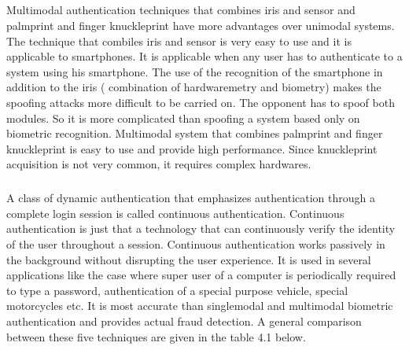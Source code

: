 \documentclass[10pt,a4paper,journal]{IEEEtran}
\begin{document}
\subparagraph{}
Multimodal authentication techniques that combines iris and sensor and palmprint and finger knuckleprint have more advantages over unimodal systems. The technique that combiles iris and sensor is very easy to use and it is applicable to smartphones. It is applicable when any user has to authenticate to a system using his smartphone. The use of the recognition of the smartphone in addition to the iris ( combination of hardwaremetry and biometry) makes the spoofing attacks more difficult to be carried on. The opponent has to spoof both modules. So it is more complicated than spooﬁng a system based only on biometric recognition. Multimodal system that combines palmprint and finger knuckleprint is easy to use and provide high performance. Since knuckleprint acquisition is not very common, it requires complex hardwares. 
\subparagraph{}
A class of dynamic authentication that emphasizes authentication through a complete login session is called continuous authentication. Continuous authentication is just that a technology that can continuously verify the identity of the user throughout a session. Continuous authentication works passively in the background without disrupting the user experience. It is used in several applications like the case where super user of a computer is periodically required to type a password, authentication of a special purpose vehicle, special motorcycles etc. It is most accurate than singlemodal and multimodal biometric authentication  and provides actual fraud detection. A general comparison between these five techniques are given in the table 4.1 below.
\end{document}
